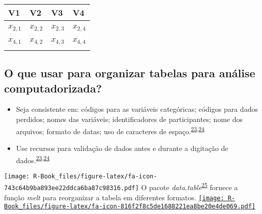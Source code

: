 \documentclass[
]{book}
\begin{document}
\begin{tabu} to 
\toprule
\textbf{V1} & \textbf{V2} & \textbf{V3} & \textbf{V4}\\
\midrule
{} &  &  & \\
$x_{2,1}$ & $x_{2,2}$ & $x_{2,3}$ & $x_{2,4}$\\
 &  &  & \\
$x_{4,1}$ & $x_{4,2}$ & $x_{4,3}$ & $x_{4,4}$\\
 &  &  & \\
\bottomrule
\end{tabu}

\hypertarget{o-que-usar-para-organizar-tabelas-para-anuxe1lise-computadorizada}{%
\subsection{O que usar para organizar tabelas para análise computadorizada?}\label{o-que-usar-para-organizar-tabelas-para-anuxe1lise-computadorizada}}

\begin{itemize}
\item
  Seja consistente em: códigos para as variáveis categóricas; códigos para dados perdidos; nomes das variáveis; identificadores de participantes; nome dos arquivos; formato de datas; uso de caracteres de espaço.\textsuperscript{\protect\hyperlink{ref-broman2018}{23},\protect\hyperlink{ref-Juluru2015}{24}}
\item
  Use recursos para validação de dados antes e durante a digitação de dados.\textsuperscript{\protect\hyperlink{ref-broman2018}{23},\protect\hyperlink{ref-Juluru2015}{24}}
\end{itemize}

\texttt{[image: R-Book\_files/figure-latex/fa-icon-743c64b9ba893ee22ddca6ba87c98316.pdf]} O pacote \emph{data.table}\textsuperscript{\protect\hyperlink{ref-data.table}{25}} fornece a função \emph{melt} para reorganizar a tabela em diferentes formatos. \href{https://cran.r-project.org/web/packages/data.table/index.html}{\texttt{[image: R-Book\_files/figure-latex/fa-icon-816f2f8c5de1688221ea8be20e4de069.pdf]}}
\end{document}
